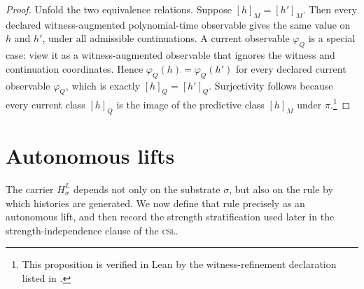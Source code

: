\documentclass[11pt]{article}
\newcommand{\CSL}{\textsc{csl}}            \newcommand{\CSLcore}{Candidate Structural Law}
\newcommand{\Substrate}{\sigma}             \newcommand{\Lift}{L}                       \newcommand{\LiftState}{\sigma_{L}}         \newcommand{\HistorySpace}{H_{\Substrate}^{\Lift}}
\newcommand{\ForgetWitnessMap}{\pi}
\newcommand{\Qclass}[1]{[#1]_{Q}}
\newcommand{\Mclass}[1]{[#1]_{M}}
\newcommand{\CurrentObservable}{\varphi_{Q}}    \newcommand{\Exposure}{\operatorname{Exposure}}
\theoremstyle{definition}
\begin{document}
\begin{proof}
Unfold the two equivalence relations.  Suppose
\(\Mclass{h}=\Mclass{h'}\).  Then every declared
witness-augmented polynomial-time observable gives the same value on
\(h\) and \(h'\), under all admissible continuations.  A current
observable \(\CurrentObservable\) is a special case: view it as a
witness-augmented observable that ignores the witness and continuation
coordinates.  Hence \(\CurrentObservable(h)=\CurrentObservable(h')\)
for every declared current observable \(\CurrentObservable\), which is
exactly \(\Qclass{h}=\Qclass{h'}\).  Surjectivity follows because
every current class \(\Qclass{h}\) is the image of the predictive class
\(\Mclass{h}\) under \(\ForgetWitnessMap\).\footnote{This proposition
is verified in Lean by the witness-refinement declaration listed in
.}
\end{proof}
 

\section{Autonomous lifts}
\label{sec:autonomous-lifts}

The carrier \(\HistorySpace\) depends not only on the substrate
\(\Substrate\), but also on the rule by which histories are generated.
We now define that rule precisely as an autonomous lift, and then
record the strength stratification used later in the
strength-independence clause of the \CSL{}.
\end{document}
